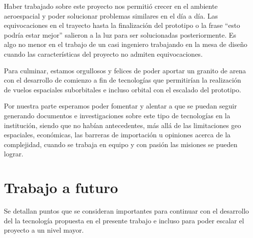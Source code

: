 
\medskip

Haber trabajado sobre este proyecto nos permitió crecer en el ambiente aeroespacial y poder solucionar problemas similares en el día a día. Las equivocaciones en el trayecto hasta la finalización del prototipo o la frase “esto podría estar mejor” salieron a la luz para ser solucionadas posteriormente. Es algo no menor en el trabajo de un casi ingeniero trabajando en la mesa de diseño cuando las características del proyecto no admiten equivocaciones.

Para culminar, estamos orgullosos y felices de poder aportar un granito de arena con el desarrollo de comienzo a fin de tecnologías que permitirían la realización de vuelos espaciales suborbitales e incluso orbital con el escalado del prototipo.

Por nuestra parte esperamos poder fomentar y alentar a que se puedan seguir generando documentos e investigaciones sobre este tipo de tecnologías en la institución, siendo que no habían antecedentes, más allá de las limitaciones geo espaciales, económicas, las barreras de importación u opiniones acerca de la complejidad, cuando se trabaja en equipo y con pasión las misiones se pueden lograr.


\section{Trabajo a futuro}

Se detallan puntos que se consideran importantes para continuar con el desarrollo del la tecnología propuesta en el presente trabajo e incluso para poder escalar el proyecto a un nivel mayor.

